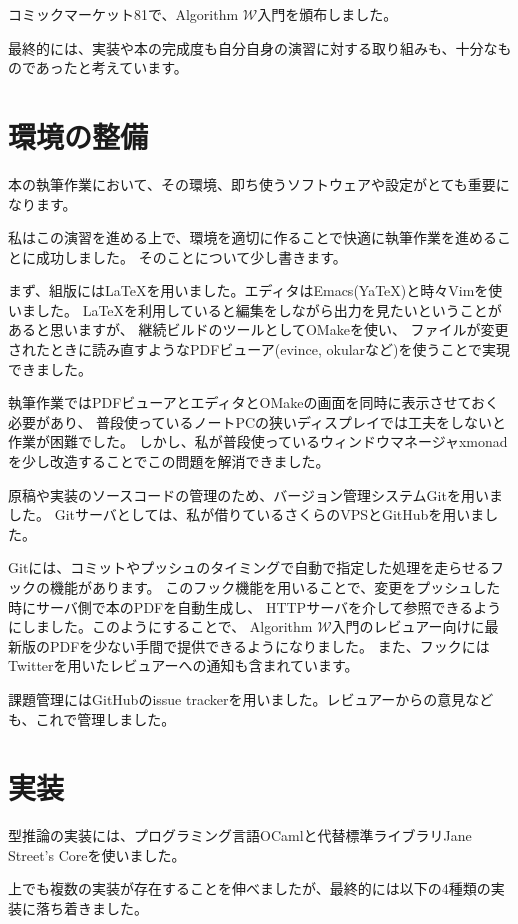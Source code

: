 \documentclass[a4paper]{jsarticle}
\begin{document}
コミックマーケット81で、Algorithm $\mathcal W$入門を頒布しました。

最終的には、実装や本の完成度も自分自身の演習に対する取り組みも、十分なものであったと考えています。

\section{環境の整備}

本の執筆作業において、その環境、即ち使うソフトウェアや設定がとても重要になります。

私はこの演習を進める上で、環境を適切に作ることで快適に執筆作業を進めることに成功しました。
そのことについて少し書きます。

まず、組版には\LaTeX{}を用いました。エディタはEmacs(YaTeX)と時々Vimを使いました。
\LaTeX{}を利用していると編集をしながら出力を見たいということがあると思いますが、
継続ビルドのツールとしてOMakeを使い、
ファイルが変更されたときに読み直すようなPDFビューア(evince, okularなど)を使うことで実現できました。

執筆作業ではPDFビューアとエディタとOMakeの画面を同時に表示させておく必要があり、
普段使っているノートPCの狭いディスプレイでは工夫をしないと作業が困難でした。
しかし、私が普段使っているウィンドウマネージャxmonadを少し改造することでこの問題を解消できました。

原稿や実装のソースコードの管理のため、バージョン管理システムGitを用いました。
Gitサーバとしては、私が借りているさくらのVPSとGitHubを用いました。

Gitには、コミットやプッシュのタイミングで自動で指定した処理を走らせるフックの機能があります。
このフック機能を用いることで、変更をプッシュした時にサーバ側で本のPDFを自動生成し、
HTTPサーバを介して参照できるようにしました。このようにすることで、
Algorithm $\mathcal W$入門のレビュアー向けに最新版のPDFを少ない手間で提供できるようになりました。
また、フックにはTwitterを用いたレビュアーへの通知も含まれています。

課題管理にはGitHubのissue trackerを用いました。レビュアーからの意見なども、これで管理しました。

\section{実装}

型推論の実装には、プログラミング言語OCamlと代替標準ライブラリJane Street's Coreを使いました。

上でも複数の実装が存在することを伸べましたが、最終的には以下の4種類の実装に落ち着きました。
\end{document}
